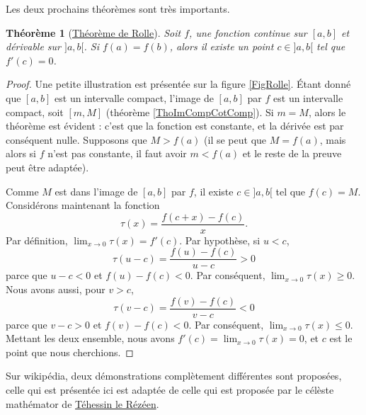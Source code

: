 \documentclass[a4paper,12pt]{book}
\newcounter{numtho}
\theoremstyle{mes_exemples}	\newtheorem{exemple}[numtho]{Exemple}
\theoremstyle{mes_tho}
\newtheorem{theorem}[numtho]{Théorème}
\begin{document}
Les deux prochains théorèmes sont très importants.
\begin{theorem}[\href{http://fr.wikipedia.org/wiki/Théorème_de_Rolle}{Théorème de Rolle}]		\label{ThoRolle}
	Soit $f$, une fonction continue sur $[a,b]$ et dérivable sur $]a,b[$. Si $f(a)=f(b)$, alors il existe un point $c\in]a,b[$ tel que $f'(c)=0$.
\end{theorem}
\newcommand{\CaptionRolle}{Illustration du théorème de Rolle. Nous avons $f(a)=f(b)$, et effectivement, au point $c$, la tangente est horizonale (dérivée nulle).}


\begin{proof}
	Une petite illustration est présentée sur la figure \ref{FigRolle}.
	Étant donné que $[a,b]$ est un intervalle compact, l'image de $[a,b]$ par $f$ est un intervalle compact, soit $[m,M]$ (théorème \ref{ThoImCompCotComp}). Si $m=M$, alors le théorème est évident : c'est que la fonction est constante, et la dérivée est par conséquent nulle. Supposons que $M> f(a)$ (il se peut que $M=f(a)$, mais alors si $f$ n'est pas constante, il faut avoir $m<f(a)$ et le reste de la preuve peut être adaptée).

	Comme $M$ est dans l'image de $[a,b]$ par $f$, il existe $c\in ]a,b[$ tel que $f(c)=M$. Considérons maintenant la fonction
	\begin{equation}
		\tau(x) =\frac{ f(c+x)-f(c) }{ x }.
	\end{equation}
	Par définition, $\lim_{x\to 0}\tau(x)=f'(c)$. Par hypothèse, si $u<c$,
	\begin{equation}
		\tau(u-c) = \frac{ f(u)-f(c) }{ u-c }>0
	\end{equation}
	parce que $u-c<0$ et $f(u)-f(c)<0$. Par conséquent, $\lim_{x\to 0}\tau(x)\geq 0$. Nous avons aussi, pour $v>c$,
	\begin{equation}
		\tau(v-c) = \frac{ f(v)-f(c) }{ v-c }<0
	\end{equation}
	parce que $v-c>0$ et $f(v)-f(c)<0$. Par conséquent, $\lim_{x\to 0}\tau(x)\leq 0$. Mettant les deux ensemble, nous avons $f'(c)=\lim_{x\to 0}\tau(x)=0$, et $c$ est le point que nous cherchions.
\end{proof}

Sur wikipédia, deux démonstrations complètement différentes sont proposées, celle qui est présentée ici est adaptée de celle qui est proposée par le célèste mathémator de \href{http://gconnan.free.fr/les\%20pdf/Deriv.pdf}{Téhessin le Rézéen}.
\end{document}
